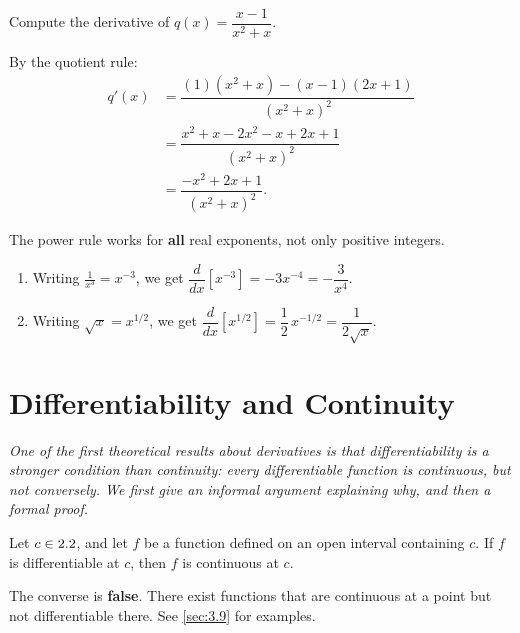 \begin{example}
\label{ex:3-4}
Compute the derivative of $q(x) = \dfrac{x - 1}{x^{2} + x}$.

By the quotient rule:
\begin{align*}
  q'(x)
  &= \dfrac{(1)(x^{2} + x) - (x - 1)(2x + 1)}{(x^{2} + x)^{2}} \\
  &= \dfrac{x^{2} + x - 2x^{2} - x + 2x + 1}{(x^{2} + x)^{2}} \\
  &= \dfrac{-x^{2} + 2x + 1}{(x^{2} + x)^{2}}.
\end{align*}
\end{example}

\begin{example}
\label{ex:3-5}
The power rule works for \textbf{all} real exponents, not only positive integers.
\begin{enumerate}[label=(\roman*)]
  \item Writing $\frac{1}{x^{3}} = x^{-3}$, we get $\dfrac{d}{dx}\!\left[x^{-3}\right] = -3x^{-4} = -\dfrac{3}{x^{4}}$.
  \item Writing $\sqrt{x} = x^{1/2}$, we get $\dfrac{d}{dx}\!\left[x^{1/2}\right] = \dfrac{1}{2}\,x^{-1/2} = \dfrac{1}{2\sqrt{x}}$.
\end{enumerate}
\end{example}

\section{Differentiability and Continuity}
\label{sec:3.5}

\textit{One of the first theoretical results about derivatives is that differentiability is a stronger condition than continuity: every differentiable function is continuous, but not conversely.  We first give an informal argument explaining why, and then a formal proof.}

\begin{theorem}
\label{thm:3-3}
Let $c \in 2.2$, and let $f$ be a function defined on an open interval containing $c$.  If $f$ is differentiable at $c$, then $f$ is continuous at $c$.
\end{theorem}

\begin{remark}
The converse is \textbf{false}.  There exist functions that are continuous at a point but not differentiable there.  See \cref{sec:3.9} for examples.
\end{remark}

